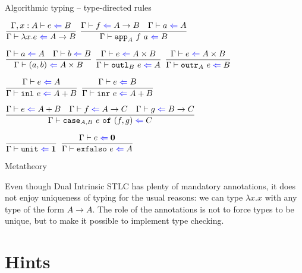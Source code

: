 \documentclass{beamer}
\newcommand{\Fun}[2]{#1 \to #2}
\newcommand{\Prod}[2]{#1 \times #2}
\newcommand{\Sum}[2]{#1 + #2}
\newcommand{\Unit}{\textbf{1}}
\newcommand{\Empty}{\textbf{0}}
\newcommand{\fun}[2]{\lambda #1. #2}
\newcommand{\pair}[2]{(#1, #2)}
\newcommand{\inl}[1][]{\texttt{inl}\ #1}
\newcommand{\inr}[1][]{\texttt{inr}\ #1}
\newcommand{\unit}{\texttt{unit}}
\newcommand{\exfalso}[1][]{\texttt{exfalso}\ #1}
\newcommand{\infrule}[3][]{\displaystyle \frac{#2}{#3} \textsc{\footnotesize{#1}}}
\newcommand{\extend}[3]{#1, #2 : #3}
\begin{document}
\begin{frame}{Algorithmic typing -- type-directed rules}

\begin{center}
  $\infrule{\fullcheck{\extend{\Gamma}{x}{A}}{e}{B}}{\check{\fun{x}{e}}{\Fun{A}{B}}}$ \enspace
  $\infrule{\check{f}{\Fun{A}{B}} \quad \check{a}{A}}{\check{\iapp{A}{f}{a}}{B}}$

  \vspace{2em}

  $\infrule{\check{a}{A} \quad \check{b}{B}}{\check{\pair{a}{b}}{\Prod{A}{B}}}$ \enspace
  $\infrule{\check{e}{\Prod{A}{B}}}{\check{\ioutl{B}{e}}{A}}$ \enspace
  $\infrule{\check{e}{\Prod{A}{B}}}{\check{\ioutr{A}{e}}{B}}$

  \vspace{2em}

  $\infrule{\check{e}{A}}{\check{\inl[e]}{\Sum{A}{B}}}$ \quad
  $\infrule{\check{e}{B}}{\check{\inr[e]}{\Sum{A}{B}}}$

  \vspace{2em}

  $\infrule{\check{e}{\Sum{A}{B}} \quad \check{f}{\Fun{A}{C}} \quad \check{g}{\Fun{B}{C}}}{\check{\icase{A}{B}{e}{f}{g}}{C}}$

  \vspace{2em}

  $\infrule{}{\check{\unit}{\Unit}}$ \quad
  $\infrule{\check{e}{\Empty}}{\check{\exfalso[e]}{A}}$
\end{center}

\end{frame}

\begin{frame}{Metatheory}

Even though Dual Intrinsic STLC has plenty of mandatory annotations, it does not enjoy uniqueness of typing for the usual reasons: we can type $\fun{x}{x}$ with any type of the form $\Fun{A}{A}$. The role of the annotations is not to force types to be unique, but to make it possible to implement type checking.

\end{frame}

\section{Hints}

\newcommand{\Hint}{\mathbf{?}}

\newcommand{\combinehints}[2]{#1 \sqcap #2}

\newcommand{\hintorder}[2]{#1 \sqsubseteq #2}
\end{document}
